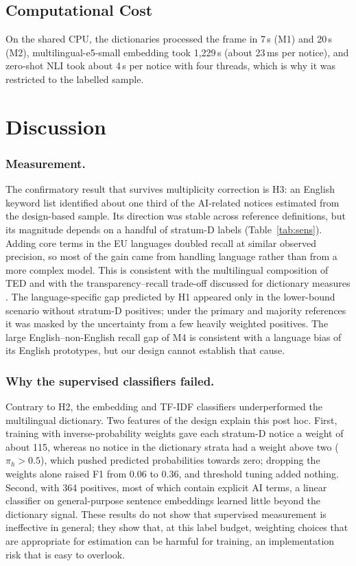 \documentclass[runningheads]{llncs}
\begin{document}
\subsection{Computational Cost}
On the shared CPU, the dictionaries processed the frame in 7\,s (M1) and 20\,s (M2), multilingual-e5-small embedding took 1,229\,s (about 23\,ms per notice), and zero-shot NLI took about 4\,s per notice with four threads, which is why it was restricted to the labelled sample.

\section{Discussion}
\subsubsection{Measurement.} The confirmatory result that survives multiplicity correction is H3: an English keyword list identified about one third of the AI-related notices estimated from the design-based sample. Its direction was stable across reference definitions, but its magnitude depends on a handful of stratum-D labels (Table~\ref{tab:sens}). Adding core terms in the EU languages doubled recall at similar observed precision, so most of the gain came from handling language rather than from a more complex model. This is consistent with the multilingual composition of TED \cite{ahmia2018} and with the transparency--recall trade-off discussed for dictionary measures \cite{gentzkow2019}. The language-specific gap predicted by H1 appeared only in the lower-bound scenario without stratum-D positives; under the primary and majority references it was masked by the uncertainty from a few heavily weighted positives. The large English--non-English recall gap of M4 is consistent with a language bias of its English prototypes, but our design cannot establish that cause.

\subsubsection{Why the supervised classifiers failed.} Contrary to H2, the embedding and TF-IDF classifiers underperformed the multilingual dictionary. Two features of the design explain this post hoc. First, training with inverse-probability weights gave each stratum-D notice a weight of about 115, whereas no notice in the dictionary strata had a weight above two ($\pi_h>0.5$), which pushed predicted probabilities towards zero; dropping the weights alone raised F1 from 0.06 to 0.36, and threshold tuning added nothing. Second, with 364 positives, most of which contain explicit AI terms, a linear classifier on general-purpose sentence embeddings learned little beyond the dictionary signal. These results do not show that supervised measurement is ineffective in general; they show that, at this label budget, weighting choices that are appropriate for estimation can be harmful for training, an implementation risk that is easy to overlook.
\end{document}
